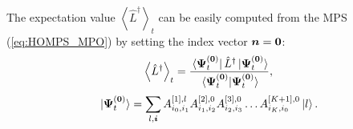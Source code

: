 The expectation value $\left\langle \hat{L}^\dagger\right\rangle_t$
can be easily computed from the MPS (\ref{eq:HOMPS_MPO}) by setting the index vector $\vb*{n} = \vb*{0}$:
\begin{equation*}
    \left\langle \hat{L}^\dagger\right\rangle_t = \frac{\bra*{\vb*{\Psi}^{(\vb*{0})}_t}\hat{L}^\dagger\ket*{\vb*{\Psi}^{(\vb*{0})}_t}}{\bra*{\vb*{\Psi}^{(\vb*{0})}_t}\ket*{\vb*{\Psi}^{(\vb*{0})}_t}},
\end{equation*}
\begin{equation*}
    \ket*{\vb*{\Psi}^{(\vb*{0})}_t} = \sum_{l,\vb*{i}} A_{i_0,i_1}^{[1],l} A_{i_1,i_2}^{[2],0} A_{i_2,i_3}^{[3],0} \dots A_{i_K,i_0}^{[K+1],0}  \ket*{l}.
\end{equation*}